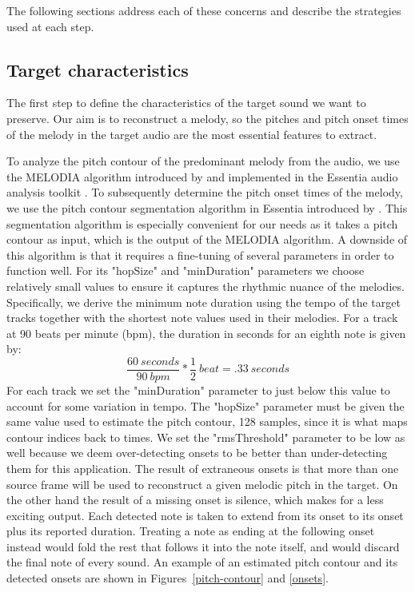 \documentclass{article}
\begin{document}
The following sections address each of these concerns and describe the strategies used at each step.

\subsection{Target characteristics}

The first step to define the characteristics of the target sound we want to preserve.
Our aim is to reconstruct a melody, so the pitches and pitch onset times of the melody in the target audio are the most essential features to extract.

To analyze the pitch contour of the predominant melody from the audio, we use the MELODIA algorithm introduced by \citet{salamon2012melody} and implemented in the Essentia audio analysis toolkit \citep{bogdanov2013essentia}.
To subsequently determine the pitch onset times of the melody, we use the pitch contour segmentation algorithm in Essentia introduced by \citet{mcnab1995signal}.
This segmentation algorithm is especially convenient for our needs as it takes a pitch contour as input, which is the output of the MELODIA algorithm.
A downside of this algorithm is that it requires a fine-tuning of several parameters in order to function well.
For its "hopSize" and "minDuration" parameters we choose relatively small values to ensure it captures the rhythmic nuance of the melodies.
Specifically, we derive the minimum note duration using the tempo of the target tracks together with the shortest note values used in their melodies.
For a track at 90 beats per minute (bpm), the duration in seconds for an eighth note is given by: \[\frac{60\ seconds}{90\ bpm} * \frac{1}{2}\ beat = .33\ seconds\]
For each track we set the "minDuration" parameter to just below this value to account for some variation in tempo.
The "hopSize" parameter must be given the same value used to estimate the pitch contour, 128 samples, since it is what maps contour indices back to times.
We set the "rmsThreshold" parameter to be low as well because we deem over-detecting onsets to be better than under-detecting them for this application.
The result of extraneous onsets is that more than one source frame will be used to reconstruct a given melodic pitch in the target.
On the other hand the result of a missing onset is silence, which makes for a less exciting output.
Each detected note is taken to extend from its onset to its onset plus its reported duration.
Treating a note as ending at the following onset instead would fold the rest that follows it into the note itself, and would discard the final note of every sound.
An example of an estimated pitch contour and its detected onsets are shown in Figures~\ref{pitch-contour} and \ref{onsets}.
\end{document}
